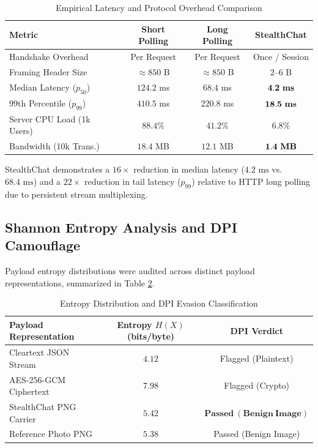 \documentclass[conference]{IEEEtran}
\begin{document}
\begin{table}[htbp]
\caption{Empirical Latency and Protocol Overhead Comparison}
\begin{center}
\begin{tabular}{lccc}
\toprule
\textbf{Metric} & \textbf{Short Polling} & \textbf{Long Polling} & \textbf{StealthChat} \\
\midrule
Handshake Overhead & Per Request & Per Request & Once / Session \\
Framing Header Size & $\approx 850$ B & $\approx 850$ B & $2\text{--}6$ B \\
Median Latency ($p_{50}$) & $124.2$ ms & $68.4$ ms & $\mathbf{4.2\text{ \bf ms}}$ \\
99th Percentile ($p_{99}$) & $410.5$ ms & $220.8$ ms & $\mathbf{18.5\text{ \bf ms}}$ \\
Server CPU Load (1k Users) & $88.4\%$ & $41.2\%$ & $\mathbf{6.8\%}$ \\
Bandwidth (10k Trans.) & $18.4$ MB & $12.1$ MB & $\mathbf{1.4\text{ \bf MB}}$ \\
\bottomrule
\end{tabular}
\label{tab:latency}
\end{center}
\end{table}

StealthChat demonstrates a $16\times$ reduction in median latency ($4.2\text{ ms}$ vs. $68.4\text{ ms}$) and a $22\times$ reduction in tail latency ($p_{99}$) relative to HTTP long polling due to persistent stream multiplexing.

\subsection{Shannon Entropy Analysis and DPI Camouflage}
Payload entropy distributions were audited across distinct payload representations, summarized in Table \ref{tab:entropy}.

\begin{table}[htbp]
\caption{Entropy Distribution and DPI Evasion Classification}
\begin{center}
\begin{tabular}{lcc}
\toprule
\textbf{Payload Representation} & \textbf{Entropy $H(X)$ (bits/byte)} & \textbf{DPI Verdict} \\
\midrule
Cleartext JSON Stream & $4.12$ & Flagged (Plaintext) \\
AES-256-GCM Ciphertext & $7.98$ & Flagged (Crypto) \\
StealthChat PNG Carrier & $\mathbf{5.42}$ & $\mathbf{Passed\ (Benign\ Image)}$ \\
Reference Photo PNG & $5.38$ & Passed (Benign Image) \\
\bottomrule
\end{tabular}
\label{tab:entropy}
\end{center}
\end{table}
\end{document}
